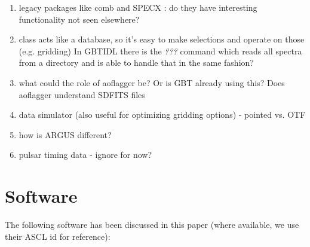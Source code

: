 \documentclass[12pt,a4paper]{article}
\begin{document}
\begin{enumerate}

\item legacy packages like comb and SPECX : do they have interesting functionality not seen elsewhere?

\item class acts like a database, so it's easy to make selections and operate on those (e.g. gridding)
  In GBTIDL there is the {\it ???} command which reads all spectra from a directory and is able
  to handle that in the same fashion?

\item   what could the role of aoflagger \cite{offringa-2012-morph-rfi-algorithm} be? Or is GBT already
  using this? Does aoflagger understand SDFITS files

\item  data simulator (also useful for optimizing gridding options) - pointed vs. OTF

\item how is ARGUS different?

\item pulsar timing data - ignore for now?
  
\end{enumerate}

\section{Software}

The following software has been discussed in this paper (where available, we use their ASCL id for reference):
\end{document}
